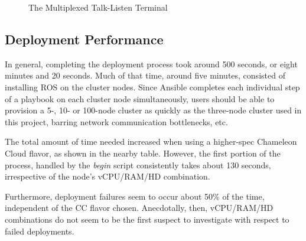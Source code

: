 \documentclass[9pt,twocolumn,twoside]{../../styles/osajnl}
\begin{document}
\begin{figure*}[htbp]
\centering
{}
\caption{The Multiplexed Talk-Listen Terminal}
\label{fig:byobu}
\end{figure*}

\subsection{Deployment Performance}
In general, completing the deployment process took around 500 seconds, or eight minutes and 20 seconds.  Much of that time, around five minutes, consisted of installing ROS on the cluster nodes.  Since Ansible completes each individual step of a playbook on each cluster node simultaneously, users should be able to provision a 5-, 10- or 100-node cluster as quickly as the three-node cluster used in this project, barring network communication bottlenecks, etc. 

The total amount of time needed increased when using a higher-spec Chameleon Cloud flavor, as shown in the nearby table.  However, the first portion of the process, handled by the \textit{begin} script consistently takes about 130 seconds, irrespective of the node's vCPU/RAM/HD combination.  

Furthermore, deployment failures seem to occur about 50\% of the time, independent of the CC flavor chosen.  Anecdotally, then, vCPU/RAM/HD combinations do not seem to be the first suspect to investigate with respect to failed deployments.
\end{document}

